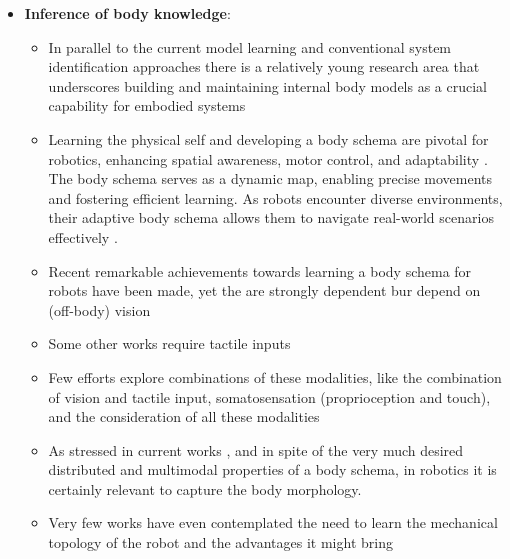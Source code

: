 \documentclass[12pt, a4paper]{article}
\begin{document}
\begin{itemize}
	\item \textbf{Inference of body knowledge}:
	\begin{itemize}
		\item In parallel to the current model learning and conventional system identification approaches there is a relatively young research area that underscores building and maintaining internal body models as a crucial capability for embodied systems
		\item Learning the physical self and developing a body schema are pivotal for robotics, enhancing spatial awareness, motor control, and adaptability \cite{Nguyen2021Sensorimotorrepresentationlearning}. The body schema serves as a dynamic map, enabling precise movements and fostering efficient learning. As robots encounter diverse environments, their adaptive body schema allows them to navigate real-world scenarios effectively \cite{Hoffmann2010Bodyschemarobotics}. 
		\item Recent remarkable achievements towards learning a body schema for robots have been made, yet the are strongly dependent bur depend on (off-body) vision \cite{Hersch2008Onlinelearningbody,MartinezCantin2010Bodyschemaacquisition,Hart2011roboticmodelecological,Lipson2019Taskagnosticself,Chen2022Fullybodyvisual,Sturm2009Bodyschemalearning}
		\item Some other works require tactile inputs\cite{Li2015Towardsbodyschema,Zenha2018Incrementaladaptationrobot,Gama2021Goaldirectedtactile}
		\item Few efforts explore combinations of these modalities, like the combination of vision and tactile input\cite{Fuke2007BodyImageConstructed}, somatosensation (proprioception and touch)\cite{Malinovska2022connectionistmodelassociating}, and the consideration of all these modalities \cite{Nguyen2019Reachingdevelopmentvisuo,Pugach2019BrainInspiredCoding,Lanillos2016Yieldingselfperception}
		\item As stressed in current works \cite{Chen2022Fullybodyvisual}, and in spite of the very much desired distributed and multimodal properties of a body schema, in robotics it is certainly relevant to capture the body morphology.
		\item Very few works have even contemplated the need to learn the mechanical topology of the robot and the advantages it might bring \cite{Bongard2006Automatedsynthesisbody,Bongard2006Resilientmachinescontinuous}
	\end{itemize}	
	

\end{itemize}
\end{document}
